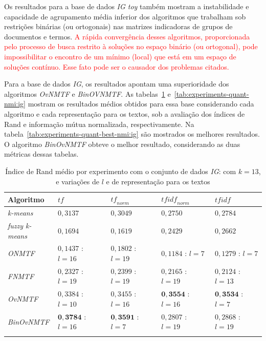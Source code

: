 \documentclass[
    12pt,                %
    oneside,            %
    a4paper,            %
    english,            %
    brazil                %
    ]{abntex2ppgsi}
\begin{document}
Os resultados para a base de dados \textit{IG toy} também mostram a instabilidade e capacidade de agrupamento média inferior dos algoritmos que trabalham sob restrições binárias (ou ortogonais) nas matrizes indicadoras de grupos de documentos e termos. \textcolor{red}{A rápida convergência desses algoritmos, proporcionada pelo processo de busca restrito à soluções no espaço binário (ou ortogonal), pode impossibilitar o encontro de um mínimo (local) que está em um espaço de soluções contínuo. Esse fato pode ser o causador dos problemas citados.}



Para a base de dados \textit{IG}, os resultados apontam uma superioridade dos algoritmos \textit{OvNMTF} e \textit{BinOVNMTF}.
As tabelas~\ref{tab:experiments-quant-rand:ig} e~\ref{tab:experiments-quant-nmi:ig} mostram os resultados médios obtidos para essa base considerando cada algoritmo e cada representação para os textos, sob a avaliação dos índices de Rand e informação mútua normalizada, respectivamente.
Na tabela~\ref{tab:experiments-quant-best-nmi:ig} são mostrados os melhores resultados.
O algoritmo \textit{BinOvNMTF} obteve o melhor resultado, considerando as duas métricas dessas tabelas.

\begin{table}[H]
\centering
    \caption{Índice de Rand médio por experimento com o conjunto de dados \textit{IG}: com $k = 13$, e variações de $l$ e de representação para os textos}
    \begin{tabular}{lllll}
        \hline
        \textbf{Algoritmo} & $\textit{tf}$ & $\textit{tf}_{norm}$ & $\textit{tfidf}_{norm}$ & $\textit{tfidf}$ \\
        \hline
        \textit{k-means}       & $0,3137$            & $0,3049$            & $0,2750$            & $0,2784$ \\
        \textit{fuzzy k-means} & $0,1694$            & $0,1619$            & $0,2429$            & $0,2662$ \\
        \textit{ONMTF}         & $0,1437$ : $l = 16$ & $0,1802$ : $l = 19$ & $0,1184$ : $l = 7$  & $0,1279$ : $l = 7$ \\
        \textit{FNMTF}         & $0,2327$ : $l = 19$ & $0,2399$ : $l = 19$ & $0,2165$ : $l = 19$ & $0,2124$ : $l = 13$ \\
        \textit{OvNMTF}        & $0,3384$ : $l = 10$ & $0,3455$ : $l = 16$ & $\mathbf{0,3554}$ : $l = 16$ & $\mathbf{0,3534}$ : $l = 7$ \\
        \textit{BinOvNMTF}     & $\mathbf{0,3784}$ : $l = 16$ & $\mathbf{0,3591}$ : $l = 7$ & $0,2807$ : $l = 19$ & $0,2868$ : $l = 19$ \\
        \hline \\
    \end{tabular}
    \label{tab:experiments-quant-rand:ig}
\end{table}
\end{document}
